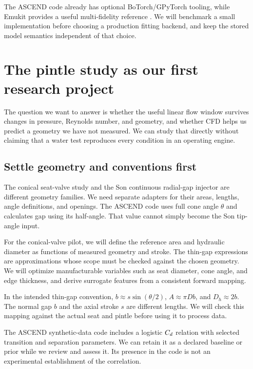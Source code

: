 The ASCEND code already has optional BoTorch/GPyTorch tooling, while Emukit provides a useful multi-fidelity reference \cite{emukit}. We will benchmark a small implementation before choosing a production fitting backend, and keep the stored model semantics independent of that choice.

\section{The pintle study as our first research project}

The question we want to answer is whether the useful linear flow window survives changes in pressure, Reynolds number, and geometry, and whether CFD helps us predict a geometry we have not measured. We can study that directly without claiming that a water test reproduces every condition in an operating engine.

\subsection{Settle geometry and conventions first}

The conical seat-valve study and the Son continuous radial-gap injector are different geometry families. We need separate adapters for their areas, lengths, angle definitions, and openings. The ASCEND code uses full cone angle $\theta$ and calculates gap using its half-angle. That value cannot simply become the Son tip-angle input.

For the conical-valve pilot, we will define the reference area and hydraulic diameter as functions of measured geometry and stroke. The thin-gap expressions are approximations whose scope must be checked against the chosen geometry. We will optimize manufacturable variables such as seat diameter, cone angle, and edge thickness, and derive surrogate features from a consistent forward mapping.

In the intended thin-gap convention, $b\approx s\sin(\theta/2)$, $A\approx\pi D b$, and $D_h\approx 2b$. The normal gap $b$ and the axial stroke $s$ are different lengths. We will check this mapping against the actual seat and pintle before using it to process data.

The ASCEND synthetic-data code includes a logistic $C_d$ relation with selected transition and separation parameters. We can retain it as a declared baseline or prior while we review and assess it. Its presence in the code is not an experimental establishment of the correlation.

